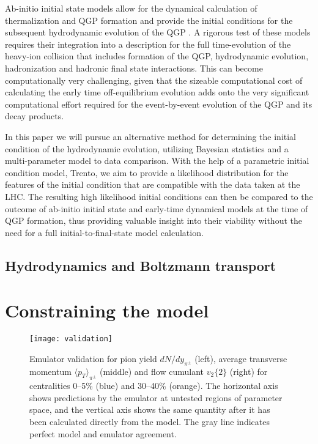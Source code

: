 \documentclass[aps,prc,reprint,amsmath]{revtex4-1}
\begin{document}
Ab-initio initial state models allow for the dynamical calculation of thermalization
and QGP formation and provide the initial conditions for the subsequent hydrodynamic 
evolution of the QGP \cite{}. A rigorous test of these models requires their integration
into a description for the full time-evolution of the heavy-ion collision that includes 
formation of the QGP, hydrodynamic evolution, hadronization and hadronic final state 
interactions. This can become computationally very challenging, given that the 
sizeable computational cost of calculating the early time off-equilibrium evolution adds 
onto the very significant computational effort required for the event-by-event evolution 
of the QGP and its decay products.

In this paper we will pursue an alternative method for determining the initial condition
of the hydrodynamic evolution, utilizing Bayesian statistics and a multi-parameter 
model to data comparison. With the help of a parametric initial condition model, Trento, we aim to
provide a likelihood distribution for the features of the initial condition that are 
compatible with the data taken at the LHC. The resulting high likelihood 
initial conditions can then be compared to the outcome of ab-initio initial state and 
early-time dynamical models at the time of QGP formation, thus providing valuable 
insight into their viability without the need for a full initial-to-final-state model 
calculation.



\subsection{Hydrodynamics and Boltzmann transport}


\section{Constraining the model}

\begin{figure*}
    \texttt{[image: validation]}
    \caption{Emulator validation for pion yield $dN/dy_{\pi^\pm}$ (left), average transverse momentum ${\langle p_T \rangle}_{\pi^\pm}$ (middle) and flow cumulant $v_2\{2\}$ (right) for centralities 0--5\% (blue) and 30--40\% (orange). The horizontal axis shows predictions by the emulator at untested regions of parameter space, and the vertical axis shows the same quantity after it has been calculated directly from the model. The gray line indicates perfect model and emulator agreement.} 
\end{figure*}
\end{document}
